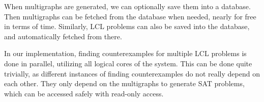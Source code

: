 When multigraphs are generated, we can optionally save them into a database.
Then multigraphs can be fetched from the database when needed, nearly for free in terms of time.
Similarly, LCL problems can also be saved into the database, and automatically fetched from there.

In our implementation, finding counterexamples for multiple LCL problems is done in parallel, utilizing all logical cores of the system.
This can be done quite trivially, as different instances of finding counterexamples do not really depend on each other.
They only depend on the multigraphs to generate SAT problems, which can be accessed safely with read-only access.

